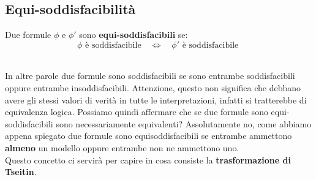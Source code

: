\subsection{Equi-soddisfacibilità }
\colorbox{SALZO}{\parbox{\dimexpr\linewidth-2\fboxsep}{\begin{theorem}
   Due formule $\phi$ e $\phi '$ sono \textbf{equi-soddisfacibili} se:
   \[   \phi \text{ è soddisfacibile} \quad \Longleftrightarrow  \quad \phi' \text{ è soddisfacibile }  \]
\end{theorem}}}\smallskip\\
In altre parole due formule sono soddisfacibili se sono entrambe soddisfacibili oppure entrambe
insoddisfacibili. Attenzione, questo non significa che debbano avere gli stessi valori di verità
in tutte le interpretazioni, infatti si tratterebbe di equivalenza logica. Possiamo quindi affermare
che se due formule sono equi-soddisfacibili sono necessariamente equivalenti? Assolutamente no, 
come abbiamo appena spiegato due formule sono equisoddisfacibili se entrambe ammettono \textbf{almeno}
un modello oppure entrambe non ne ammettono uno. \\
Questo concetto ci servirà per capire in cosa consiste la \textbf{trasformazione di Tseitin}.


